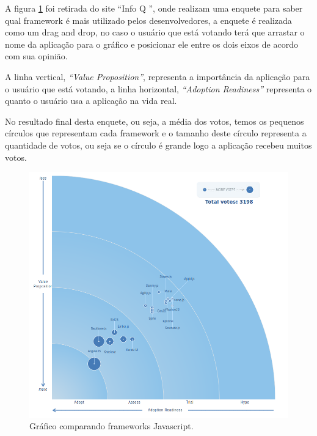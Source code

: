 A figura \ref{fig:Gráfico Comparando Frameworks Javascript} foi retirada do site ``Info Q \cite{fwJs}'', onde realizam uma enquete para saber qual framework é mais utilizado pelos desenvolvedores, a enquete é realizada como um drag and drop, no caso o usuário que está votando terá que arrastar o nome da aplicação para o gráfico e posicionar ele entre os dois eixos de acordo com sua opinião.

A linha vertical, \textit{``Value Proposition''}, representa a importância da aplicação para o usuário que está votando, a linha horizontal, \textit{``Adoption Readiness''} representa o quanto o usuário usa a aplicação na vida real. 

 No resultado final desta enquete, ou seja, a média dos votos, temos os pequenos círculos que representam cada framework e o tamanho deste círculo representa a quantidade de votos, ou seja se o círculo é grande logo a aplicação recebeu muitos votos.

\begin{figure}[!ht]
\centering
\includegraphics[scale=0.5]{images/angularjs_framework_comparison.png}
\caption{Gráfico comparando frameworks Javascript.}
\label{fig:Gráfico Comparando Frameworks Javascript}
\end{figure}

\newpage


